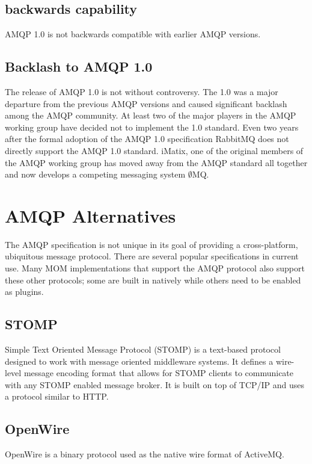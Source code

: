 \documentclass{thesis}
\begin{document}
\subsection{backwards capability}

AMQP 1.0 is not backwards compatible with earlier AMQP versions.  

\subsection{Backlash to AMQP 1.0}

The release of AMQP 1.0 is not without controversy.  The 1.0 was a major departure from the previous AMQP versions and caused significant backlash among the AMQP community.  At least two of the major players in the AMQP working group have decided not to implement the 1.0 standard.  Even two years after the formal adoption of the AMQP 1.0 specification RabbitMQ does not directly support the AMQP 1.0 standard.  iMatix, one of the original members of the AMQP working group has moved away from the AMQP standard all together and now develops a competing messaging system $\emptyset$MQ.  %

\section{AMQP Alternatives}
The AMQP specification is not unique in its goal of providing a cross-platform, ubiquitous message protocol.  There are several popular specifications in current use.  Many MOM implementations that support the AMQP protocol also support these other protocols; some are built in natively while others need to be enabled as plugins.   

\subsection{STOMP}
Simple Text Oriented Message Protocol (STOMP) is a text-based protocol designed to work with message oriented middleware systems.  It defines a wire-level message encoding format that allows for STOMP clients to communicate with any STOMP enabled message broker.  It is built on top of TCP/IP and uses a protocol similar to HTTP.  

\subsection{OpenWire}
OpenWire is a binary protocol used as the native wire format of ActiveMQ.  %
\end{document}
